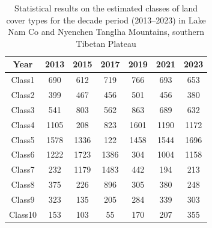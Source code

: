 \documentclass[final,5p,times,twocolumn]{elsarticle}
\begin{document}
\begin{table}[H]
  \centering
  \begin{tabular}{| ccccccc |}
    \textbf{Year} & \textbf{2013} & \textbf{2015} & \textbf{2017} & \textbf{2019} & \textbf{2021} & \textbf{2023} \\
    \hline
    \hline
    Class1 & 690 & 612 & 719 & 766 & 693 & 653 \\
    Class2 & 399 & 467 & 456 & 501 & 456 & 380 \\
    Class3 & 541 & 803 & 562 & 863 & 689 & 632 \\
    Class4 & 1105 & 208 & 823 & 1601 & 1190 & 1172 \\
    Class5 & 1578 & 1336 & 122 & 1458 & 1544 & 1696 \\
    Class6 & 1222 & 1723 & 1386 & 304 & 1004 & 1158 \\
    Class7 & 232 & 1179 & 1483 & 442 & 194 & 213 \\
    Class8 & 375 & 226 & 896 & 305 & 380 & 248 \\
    \rowcolor{cyan!10} Class9 & 323 & 135 & 205 & 284 & 339 & 303 \\
    Class10 & 153 & 103 & 55 & 170 & 207 & 355 \\
  \end{tabular}
  \caption{Statistical results on the estimated classes of land cover types for the decade period (2013--2023) in Lake Nam Co and Nyenchen Tanglha Mountains, southern Tibetan Plateau}
  \label{tab01}
\end{table}
\end{document}
